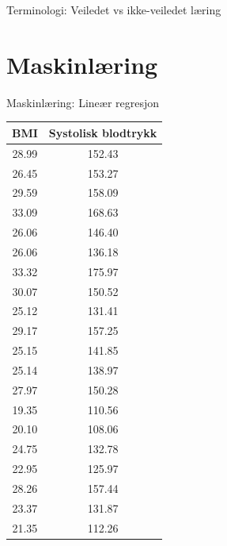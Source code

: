 \documentclass[8pt]{beamer}
\begin{document}
\begin{frame}{Terminologi: Veiledet vs ikke-veiledet læring}
		\vfill
	\end{frame}

	\section{Maskinlæring}

	\begin{frame}{Maskinlæring: Lineær regresjon} %
		\small
		\centering
		\vfill
		\begin{tabular}{|c|c|}
			\hline
			\textbf{BMI}&\textbf{Systolisk blodtrykk}\\
			\hline
			28.99&152.43\\
			26.45&153.27\\
			29.59&158.09\\
			33.09&168.63\\
			26.06&146.40\\
			26.06&136.18\\
			33.32&175.97\\
			30.07&150.52\\
			25.12&131.41\\
			29.17&157.25\\
			25.15&141.85\\
			25.14&138.97\\
			27.97&150.28\\
			19.35&110.56\\
			20.10&108.06\\
			24.75&132.78\\
			22.95&125.97\\
			28.26&157.44\\
			23.37&131.87\\
			21.35&112.26\\
			\hline
		\end{tabular}
		\vfill
	\end{frame}
\end{document}
